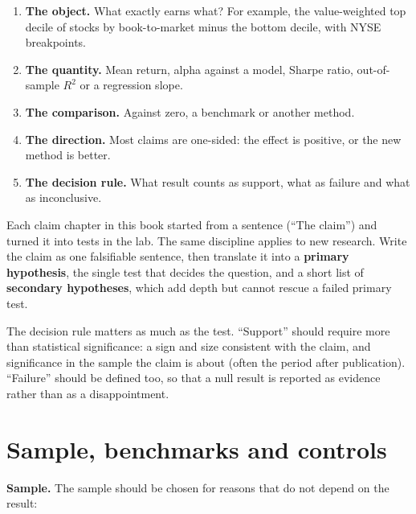 \begin{enumerate}
  \item \textbf{The object.} What exactly earns what? For example, the value-weighted top decile of stocks by book-to-market minus the bottom decile, with NYSE breakpoints.
  \item \textbf{The quantity.} Mean return, alpha against a model, Sharpe ratio, out-of-sample $R^2$ or a regression slope.
  \item \textbf{The comparison.} Against zero, a benchmark or another method.
  \item \textbf{The direction.} Most claims are one-sided: the effect is positive, or the new method is better.
  \item \textbf{The decision rule.} What result counts as support, what as failure and what as inconclusive.
\end{enumerate}

Each claim chapter in this book started from a sentence (``The claim'') and turned it into tests in the lab. The same discipline applies to new research. Write the claim as one falsifiable sentence, then translate it into a \textbf{primary hypothesis}, the single test that decides the question, and a short list of \textbf{secondary hypotheses}, which add depth but cannot rescue a failed primary test.

The decision rule matters as much as the test. ``Support'' should require more than statistical significance: a sign and size consistent with the claim, and significance in the sample the claim is about (often the period after publication). ``Failure'' should be defined too, so that a null result is reported as evidence rather than as a disappointment.

\section{Sample, benchmarks and controls}
\label{sec:24-sample}

\textbf{Sample.} The sample should be chosen for reasons that do not depend on the result:

